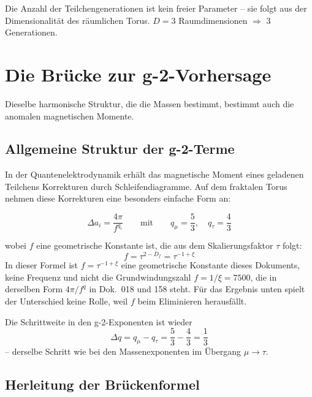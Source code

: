 	\begin{keypoint}
		Die Anzahl der Teilchengenerationen ist kein freier Parameter -- sie folgt aus der Dimensionalität des räumlichen Torus. $D = 3$ Raumdimensionen $\Rightarrow$ 3 Generationen.
	\end{keypoint}
	
	
	\section{Die Brücke zur g-2-Vorhersage}
	
	Dieselbe harmonische Struktur, die die Massen bestimmt, bestimmt auch die anomalen magnetischen Momente.
	
	\subsection{Allgemeine Struktur der g-2-Terme}
	
	In der Quantenelektrodynamik erhält das magnetische Moment eines geladenen Teilchens Korrekturen durch Schleifendiagramme. Auf dem fraktalen Torus nehmen diese Korrekturen eine besonders einfache Form an:
	
	\begin{equation}
		\Delta a_i = \frac{4\pi}{f^{q_i}} \qquad \text{mit} \qquad q_\mu = \frac{5}{3}, \quad q_\tau = \frac{4}{3}
		\label{eq:g2-fractal}
	\end{equation}
	
	wobei $f$ eine geometrische Konstante ist, die aus dem Skalierungsfaktor $\tau$ folgt:
	\begin{equation}
		f = \tau^{2-D_f} = \tau^{-1+\xi}
	\end{equation}
	In dieser Formel ist $f = \tau^{-1+\xi}$ eine geometrische Konstante dieses Dokuments, keine Frequenz und nicht die Grundwindungszahl $f = 1/\xi = 7500$, die in derselben Form $4\pi/f^{q}$ in Dok.~018 und 158 steht. Für das Ergebnis unten spielt der Unterschied keine Rolle, weil $f$ beim Eliminieren herausfällt.

	Die Schrittweite in den g-2-Exponenten ist wieder
	\begin{equation}
		\Delta q = q_\mu - q_\tau = \frac{5}{3} - \frac{4}{3} = \frac{1}{3}
	\end{equation}
	-- derselbe Schritt wie bei den Massenexponenten im Übergang $\mu \to \tau$.
	
	\subsection{Herleitung der Brückenformel}
	
